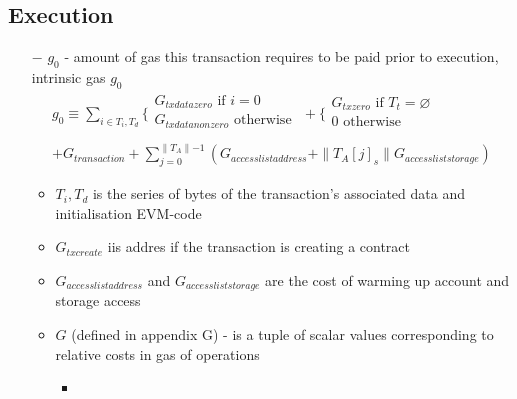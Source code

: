 \documentclass{article}
\begin{document}
\subsection{Execution}

\begin{itemize}
    \item[$-$] $g_0$ - amount of gas this transaction requires to be paid prior to execution, intrinsic gas $g_0$
    \begin{align*}     
        g_0 \equiv \sum_{i \in T_i, T_d} \biggl\{
            \begin{array}{ll}
                G_{txdatazero} \text{ if } i=0\\
                G_{txdatanonzero} \text{ otherwise }\\
            \end{array}
            + \biggl\{
                \begin{array}{ll}
                    G_{txzero} \text{ if } T_t = \varnothing \\
                    0 \text{ otherwise} \\
                \end{array} \\
            + G_{transaction} 
            + \sum_{j=0}^{\parallel T_A \parallel - 1} 
            (G_{accesslistaddress} 
            + \| T_A[j]_s \| G_{accessliststorage})
    \end{align*}
    \begin{itemize}
        \item $T_i, T_d$ is the series of bytes of the transaction's associated data and initialisation EVM-code
        \item $G_{txcreate}$ iis addres if the transaction is creating a contract
        \item $G_{accesslistaddress}$ and $G_{accessliststorage}$ are the cost of warming up account and storage access
        \item $G$ (defined in appendix G) - is a tuple of scalar values corresponding to relative costs in gas of operations 
        \begin{itemize}
            \item 
        \end{itemize}
    \end{itemize}
\end{itemize}
\end{document}
